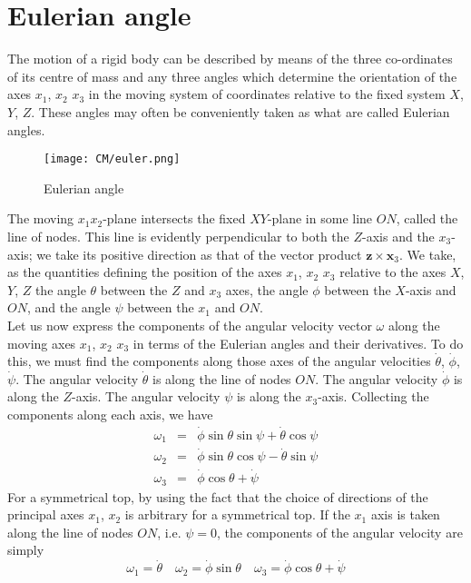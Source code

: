 \section{Eulerian angle}
The motion of a rigid body can be described by means of the three co-ordinates of its centre of mass and any three angles which determine the orientation of the axes $x_1$, $x_2$ $x_3$ in the moving system of coordinates relative to the fixed system $X$, $Y$, $Z$. These angles may often be conveniently taken as what are called Eulerian angles.
\begin{figure}[!h]
	\centering
	\texttt{[image: CM/euler.png]}
	\caption{Eulerian angle}
\end{figure}
The moving $x_1x_2$-plane intersects the fixed $XY$-plane in some line $ON$, called the line of nodes. 
This line is evidently perpendicular to both the $Z$-axis and the $x_3$-axis; we take its positive direction as that of the vector product $\bm{z} \times \bm{x}_3$.
We take, as the quantities defining the position of the axes $x_1$, $x_2$ $x_3$ relative to the axes $X$, $Y$, $Z$ the angle $\theta$ between the $Z$ and $x_3$ axes, the angle $\phi$ between the $X$-axis and $ON$, and the angle $\psi$  between the $x_1$ and $ON$.\\
Let us now express the components of the angular velocity  vector $\omega$ along the moving axes $x_1$, $x_2$ $x_3$ in terms of the Eulerian angles and their derivatives. 
To do this, we must find the components along those axes of the angular velocities $\dot{\theta}$, $\dot{\phi}$, $\dot{\psi}$. The angular velocity $\dot{\theta}$ is along the line of nodes $ON$. The angular velocity $\dot{\phi}$ is along the $Z$-axis. The angular velocity $\psi$ is along the $x_3$-axis. Collecting the components along each axis, we have
\begin{eqnarray}
\omega_1 &=& \dot{\phi}\sin\theta\sin\psi + \dot{\theta}\cos\psi \nonumber \\
\omega_2 &=& \dot{\phi}\sin\theta\cos\psi - \dot{\theta}\sin\psi \nonumber \\
\omega_3 &=& \dot{\phi} \cos\theta + \dot{\psi} \nonumber
\end{eqnarray}
For a symmetrical top, by using the fact that the choice of directions of the principal axes $x_1$, $x_2$ is arbitrary for a symmetrical top. 
If the $x_1$ axis is taken along the line of nodes $ON$, i.e. $\psi = 0$, the components of the angular velocity are simply
\[\omega_1 = \dot{\theta} \quad \omega_2 = \dot{\phi}\sin\theta \quad \omega_3 = \dot{\phi}\cos\theta + \dot{\psi}\]
